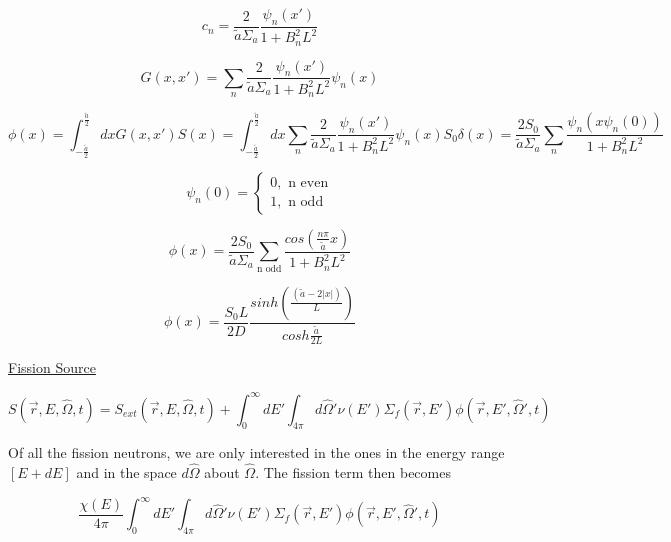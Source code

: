 \documentclass[12pt]{article}
\newcommand{\rvec}{\ensuremath{\vec{r}}}
\newcommand{\omvec}{\ensuremath{\hat{\Omega}}}
\begin{document}
\begin{equation*}
c_n = \frac{2}{\tilde{a}\Sigma_a}\frac{\psi_n(x')}{1+B_n^2L^2}
\end{equation*}

\begin{equation*}
G(x,x') = \sum_n \frac{2}{\tilde{a}\Sigma_a}\frac{\psi_n(x')}{1+B_n^2L^2}\psi_n(x)
\end{equation*}

\begin{equation*}
\phi(x) = \int_{-\tfrac{\tilde{a}}{2}}^{\tfrac{\tilde{a}}{2}}dxG(x,x')S(x) = 
\int_{-\tfrac{\tilde{a}}{2}}^{\tfrac{\tilde{a}}{2}}dx 
\sum_n \frac{2}{\tilde{a}\Sigma_a}\frac{\psi_n(x')}{1+B_n^2L^2}\psi_n(x) S_0 \delta(x)
= \frac{2S_0}{\tilde{a}\Sigma_a}\sum_n\frac{\psi_n(x\psi_n(0))}{1+B_n^2L^2}
\end{equation*}

\begin{equation*}
\psi_n(0) = 
	\begin{cases}
	0, \text{ n even} \\
	1, \text{ n odd}
	\end{cases}
\end{equation*}

\begin{equation*}
\phi(x)=\frac{2S_0}{\tilde{a}\Sigma_a}\sum_{\text{n odd}}\frac{cos(\tfrac{n\pi}{\tilde{a}}x)}{1+B_n^2L^2}
\end{equation*}

\begin{equation*}
\phi(x) = \frac{S_0L}{2D}\frac{sinh(\tfrac{(\tilde{a} - 2|x|)}{L})}{cosh\tfrac{\tilde{a}}{2L}}
\end{equation*}

\underline{Fission Source}

\begin{equation*}
S(\rvec,E,\omvec,t) = S_{ext}(\rvec,E,\omvec,t) + 
\int_0^{\infty}dE'\int_{4\pi}d\omvec' \nu(E')\Sigma_f(\rvec,E')\phi(\rvec,E',\omvec',t)
\end{equation*}

Of all the fission neutrons, we are only interested in the ones in the energy range $[E+dE]$ and in the
space $d\omvec$ about $\omvec$. The fission term then becomes

\begin{equation*}
\frac{\chi(E)}{4\pi}\int_0^{\infty}dE'
\int_{4\pi}d\omvec'\nu(E')\Sigma_f(\rvec,E')\phi(\rvec,E',\omvec',t)
\end{equation*}
\end{document}
